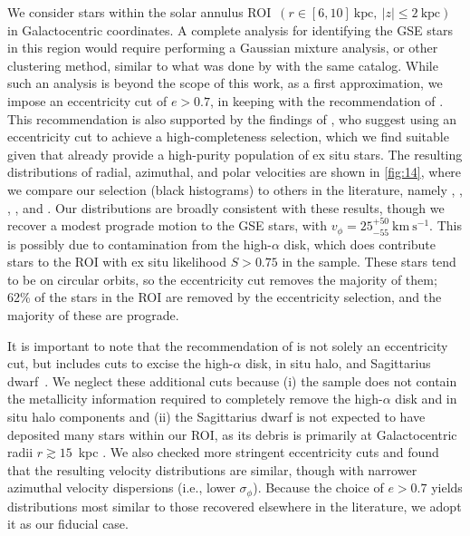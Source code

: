 \documentclass[twocolumn,tighten,twocolappendix]{aastex701}
\newcommand{\kms}{\ensuremath{\text{km}~\text{s}^{-1}}}
\begin{document}
We consider stars within the solar annulus ROI~$(r \in [6,10]~\mathrm{kpc},\ |z|\leq2~\mathrm{kpc})$ in Galactocentric coordinates. A complete analysis for identifying the GSE stars in this region would require performing a Gaussian mixture analysis, or other clustering method, similar to what was done by \citet{2020ApJ...903...25N} with the same catalog.  While such an analysis is beyond the scope of this work, as a first approximation, we impose an eccentricity cut of $e > 0.7$, in keeping with the recommendation of \citet{2020ApJ...901...48N}. This recommendation is also supported by the findings of \citet{2022MNRAS.510.5119L}, who suggest using an eccentricity cut to achieve a high-completeness selection, which we find suitable given that \citet{2020A&A...636A..75O} already provide a high-purity population of ex situ stars. The resulting distributions of radial, azimuthal, and polar velocities are shown in \autoref{fig:14}, where we compare our selection (black histograms) to others in the literature, namely \citet[][solid yellow]{2019ApJ...874....3N}, \citet[][dashed turquoise]{2019MNRAS.486..378L}, \citet[][dashed-dotted blue]{2019PhRvD..99b3012E}, \citet[][solid orange]{2020ApJ...903...25N}, and \citet[][dotted green]{2020PhRvD.101b3006O}. Our distributions are broadly consistent with these results, though we recover a modest prograde motion to the GSE stars, with $v_\phi = 25^{+50}_{-55}~\kms$. This is possibly due to contamination from the high-$\alpha$ disk, which does contribute stars to the ROI with ex situ likelihood $S > 0.75$ in the \citet{2020A&A...636A..75O} sample. These stars tend to be on circular orbits, so the eccentricity cut removes the majority of them; 62\% of the stars in the ROI are removed by the eccentricity selection, and the majority of these are prograde.

It is important to note that the recommendation of \citet{2020ApJ...901...48N} is not solely an eccentricity cut, but includes cuts to excise the high-$\alpha$ disk, in situ halo, and Sagittarius dwarf~\citep{1994Natur.370..194I}. We neglect these additional cuts because (i) the \citet{2020A&A...636A..75O} sample does not contain the metallicity information required to completely remove the high-$\alpha$ disk and in situ halo components and  (ii) the Sagittarius dwarf is not expected to have deposited many stars within our ROI, as its debris is primarily at Galactocentric radii $r \gtrsim 15$~kpc \citep[e.g.,][]{2020ApJ...900..103J}. We also checked more stringent eccentricity cuts and found that the resulting velocity distributions are similar, though with narrower azimuthal velocity dispersions (i.e., lower $\sigma_\phi$). Because the choice of $e > 0.7$ yields distributions most similar to those recovered elsewhere in the literature, we adopt it as our fiducial case.
\end{document}
